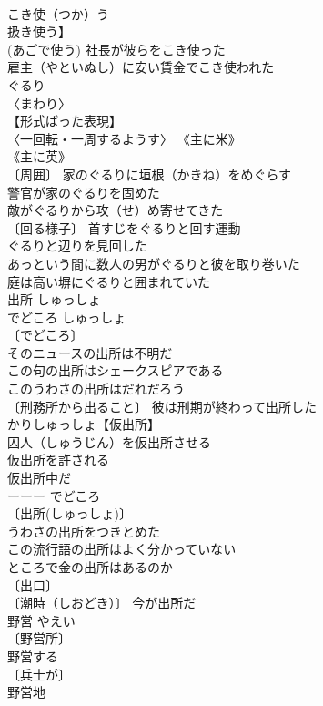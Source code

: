 \documentclass[8pt]{extreport}
\begin{document}
\begin{CJK}{UTF8}{min}
\\	こき使（つか）う	
\\	扱き使う】	
\\	(あごで使う) 社長が彼らをこき使った 
\\	雇主（やといぬし）に安い賃金でこき使われた 
\\	ぐるり		
\\	〈まわり〉 
\\	【形式ばった表現】 
\\	〈一回転・一周するようす〉 《主に米》 
\\	《主に英》 
\\	〔周囲〕 家のぐるりに垣根（かきね）をめぐらす 
\\	警官が家のぐるりを固めた 
\\	敵がぐるりから攻（せ）め寄せてきた 
\\	〔回る様子〕 首すじをぐるりと回す運動 
\\	ぐるりと辺りを見回した 
\\	あっという間に数人の男がぐるりと彼を取り巻いた 
\\	庭は高い塀にぐるりと囲まれていた 
\\	出所	しゅっしょ 
\\	でどころ	しゅっしょ 
\\	〔でどころ〕
\\	そのニュースの出所は不明だ 
\\	この句の出所はシェークスピアである 
\\	このうわさの出所はだれだろう 
\\	〔刑務所から出ること〕 彼は刑期が終わって出所した 
\\	かりしゅっしょ【仮出所】 
\\	囚人（しゅうじん）を仮出所させる 
\\	仮出所を許される 
\\	仮出所中だ 
\\	ーーー でどころ 
\\	〔出所(しゅっしょ)〕
\\	うわさの出所をつきとめた 
\\	この流行語の出所はよく分かっていない 
\\	ところで金の出所はあるのか 
\\	〔出口〕
\\	〔潮時（しおどき）〕 今が出所だ 
\\	野営	やえい	
\\	〔野営所〕
\\	野営する 
\\	〔兵士が〕
\\	野営地 

\end{CJK}
\end{document}
